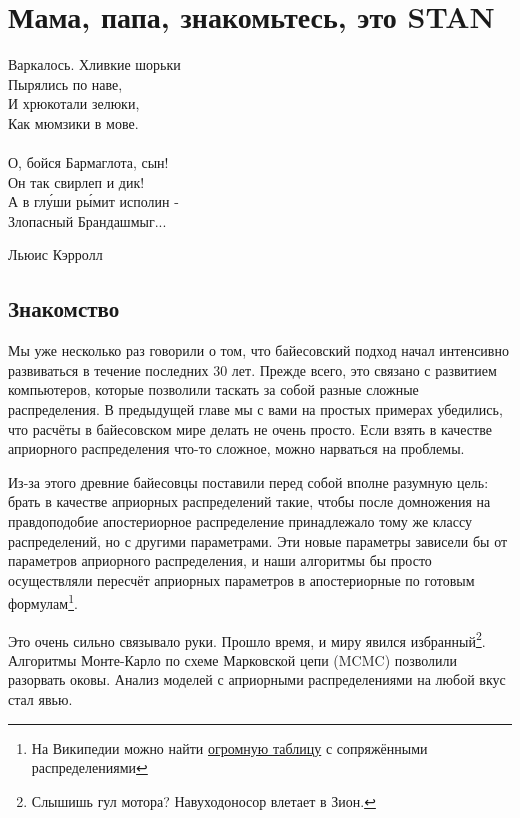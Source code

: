 

\chapter{Мама, папа, знакомьтесь, это STAN}

\epigraph{
	Варкалось. Хливкие шорьки \\
	Пырялись по наве, \\
	И хрюкотали зелюки, \\
	Как мюмзики в мове. \\
	\mbox{    }\\
	О, бойся Бармаглота, сын!\\
	Он так свирлеп и дик! \\
	А в глу́ши ры́мит исполин - \\
	Злопасный Брандашмыг...}{Льюис Кэрролл}

\section{Знакомство} 

Мы уже несколько раз говорили о том, что байесовский подход начал интенсивно развиваться в течение последних 30 лет. Прежде всего, это связано с  развитием компьютеров, которые позволили таскать за собой разные сложные распределения. В предыдущей главе мы с вами на простых примерах убедились, что расчёты  в байесовском мире делать не очень просто. Если взять в качестве априорного распределения что-то сложное, можно нарваться на проблемы.

 Из-за этого древние байесовцы поставили перед собой вполне разумную цель: брать в качестве априорных распределений такие, чтобы после домножения на правдоподобие апостериорное распределение принадлежало тому же классу распределений, но с другими параметрами. Эти новые параметры зависели бы от параметров априорного распределения, и наши алгоритмы бы просто осуществляли пересчёт априорных параметров в апостериорные по готовым формулам\footnote{На Википедии можно найти \href{https://en.wikipedia.org/wiki/Conjugate_prior}{огромную таблицу} с сопряжёнными распределениями}.  
 
 Это очень сильно связывало руки. Прошло время, и миру явился избранный\footnote{Слышишь гул мотора? Навуходоносор влетает в Зион.}.  Алгоритмы Монте-Карло по схеме Марковской цепи (MCMC) позволили разорвать оковы. Анализ моделей с априорными распределениями на любой вкус стал явью.
 
